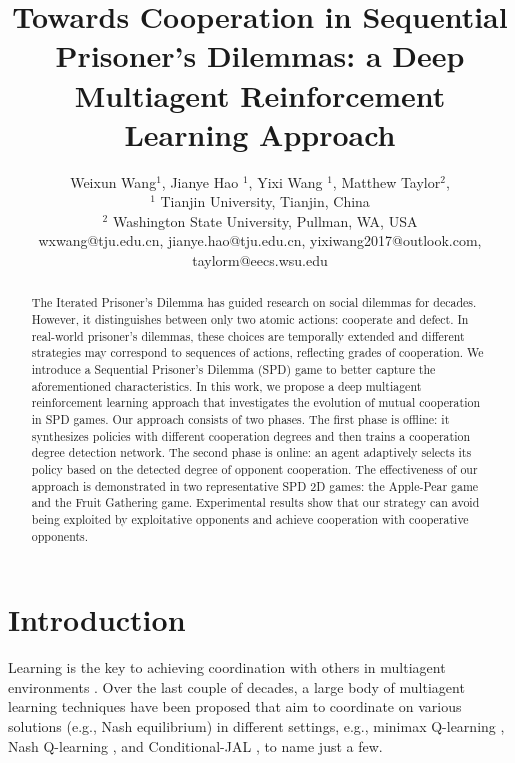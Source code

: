 \documentclass{article}
\title{Towards Cooperation in Sequential Prisoner's Dilemmas: a
Deep Multiagent Reinforcement Learning Approach}
\author{
Weixun Wang$^1$,
Jianye Hao $^1$,
Yixi Wang $^1$,
Matthew Taylor$^2$,
\\
$^1$ Tianjin University, Tianjin, China \\
$^2$ Washington State University, Pullman, WA, USA\\
%
wxwang@tju.edu.cn,
jianye.hao@tju.edu.cn,
yixiwang2017@outlook.com,
taylorm@eecs.wsu.edu
}
\begin{document}
\maketitle

\begin{abstract}  %
The Iterated Prisoner's Dilemma has guided research on social dilemmas for decades. However, it distinguishes between only two atomic actions: cooperate and defect. In real-world prisoner's dilemmas, these choices are temporally extended and different strategies may correspond to sequences of actions, reflecting grades of cooperation. We introduce a Sequential Prisoner's Dilemma (SPD) game to better capture the aforementioned characteristics. In this work, we propose a deep multiagent reinforcement learning approach that investigates the evolution of mutual cooperation in SPD games. Our approach consists of two phases. The first phase is offline: it synthesizes policies with different cooperation degrees and then trains a cooperation degree detection network. The second phase is online: an agent adaptively selects its policy based on the detected degree of opponent cooperation. The effectiveness of our approach is demonstrated in two representative SPD 2D games: the Apple-Pear game and the Fruit Gathering game. Experimental results show that our strategy can avoid being exploited by exploitative opponents and achieve cooperation with cooperative opponents.
\end{abstract}

\section{Introduction}
Learning is the key to achieving coordination with others in multiagent environments \cite{stone2000multiagent}. Over the last couple of decades, a large body of multiagent learning techniques have been proposed that aim to coordinate on various solutions (e.g., Nash equilibrium) in different settings, e.g., minimax Q-learning \cite{littman1994markov}, Nash Q-learning \cite{hu2003nash}, and Conditional-JAL \cite{banerjee2007reaching}, to name just a few.
\end{document}

